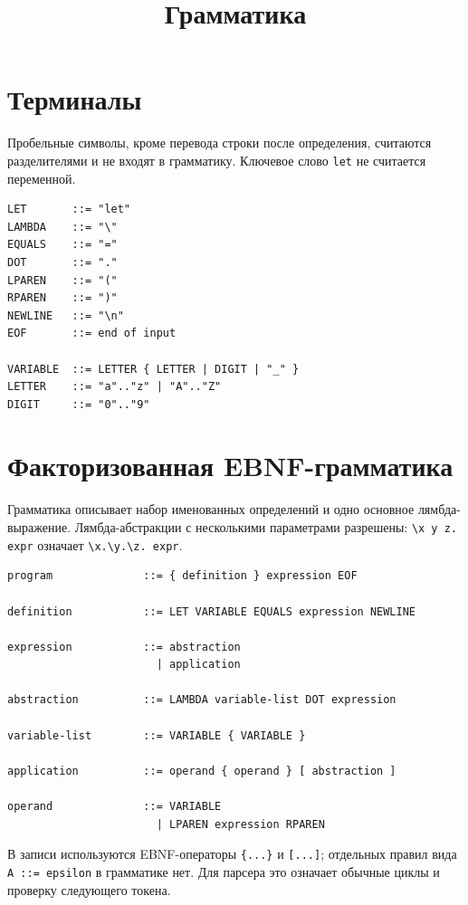 \documentclass[12pt,a4paper]{article}
\title{Грамматика}
\date{}
\begin{document}
\maketitle

\section*{Терминалы}

Пробельные символы, кроме перевода строки после определения, считаются
разделителями и не входят в грамматику. Ключевое слово \texttt{let} не
считается переменной.

\begin{lstlisting}[style=grammar]
LET       ::= "let"
LAMBDA    ::= "\"
EQUALS    ::= "="
DOT       ::= "."
LPAREN    ::= "("
RPAREN    ::= ")"
NEWLINE   ::= "\n"
EOF       ::= end of input

VARIABLE  ::= LETTER { LETTER | DIGIT | "_" }
LETTER    ::= "a".."z" | "A".."Z"
DIGIT     ::= "0".."9"
\end{lstlisting}

\section*{Факторизованная EBNF-грамматика}

Грамматика описывает набор именованных определений и одно основное
лямбда-выражение. Лямбда-абстракции с несколькими параметрами разрешены:
\texttt{\textbackslash x y z. expr} означает
\texttt{\textbackslash x.\textbackslash y.\textbackslash z. expr}.

\begin{lstlisting}[style=grammar]
program              ::= { definition } expression EOF

definition           ::= LET VARIABLE EQUALS expression NEWLINE

expression           ::= abstraction
                       | application

abstraction          ::= LAMBDA variable-list DOT expression

variable-list        ::= VARIABLE { VARIABLE }

application          ::= operand { operand } [ abstraction ]

operand              ::= VARIABLE
                       | LPAREN expression RPAREN
\end{lstlisting}

В записи используются EBNF-операторы \texttt{\{...\}} и \texttt{[...]};
отдельных правил вида \texttt{A ::= epsilon} в грамматике нет. Для
парсера это означает обычные циклы и проверку следующего токена.
\end{document}
